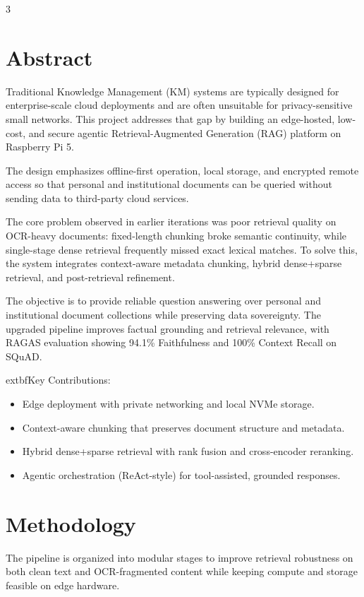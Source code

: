 \documentclass[10pt,a4paper]{article}
\begin{document}
\begin{multicols}{3}
\justifying
\setlength{\columnsep}{0.55cm}
\setlength{\columnseprule}{0.2pt}

\section{Abstract}
\justifying
Traditional Knowledge Management (KM) systems are typically designed for enterprise-scale cloud deployments and are often unsuitable for privacy-sensitive small networks. This project addresses that gap by building an edge-hosted, low-cost, and secure agentic Retrieval-Augmented Generation (RAG) platform on Raspberry Pi 5. 

The design emphasizes offline-first operation, local storage, and encrypted remote access so that personal and institutional documents can be queried without sending data to third-party cloud services.

The core problem observed in earlier iterations was poor retrieval quality on OCR-heavy documents: fixed-length chunking broke semantic continuity, while single-stage dense retrieval frequently missed exact lexical matches. To solve this, the system integrates context-aware metadata chunking, hybrid dense+sparse retrieval, and post-retrieval refinement.

The objective is to provide reliable question answering over personal and institutional document collections while preserving data sovereignty. The upgraded pipeline improves factual grounding and retrieval relevance, with RAGAS evaluation showing 94.1\% Faithfulness and 100\% Context Recall on SQuAD.

	extbf{Key Contributions:}
\begin{itemize}
    \item Edge deployment with private networking and local NVMe storage.
    \item Context-aware chunking that preserves document structure and metadata.
    \item Hybrid dense+sparse retrieval with rank fusion and cross-encoder reranking.
    \item Agentic orchestration (ReAct-style) for tool-assisted, grounded responses.
\end{itemize}

\section{Methodology}
The pipeline is organized into modular stages to improve retrieval robustness on both clean text and OCR-fragmented content while keeping compute and storage feasible on edge hardware.


\end{multicols}
\end{document}
